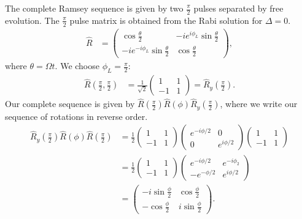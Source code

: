 \documentclass[a4paper, 11pt, normalem]{report}
\begin{document}
The complete Ramsey sequence is given by two $\frac{\pi}{2}$ pulses separated by free evolution.
The $\frac{\pi}{2}$ pulse matrix is obtained from the Rabi solution for $\Delta = 0$.
\begin{align}
    \hat{R} &= \begin{pmatrix} \cos\frac{\theta}{2} & -ie^{i\phi_L}\sin\frac{\theta}{2} \\ -ie^{-i\phi_L}\sin\frac{\theta}{2} & \cos\frac{\theta}{2}\end{pmatrix},
\end{align}
where $\theta=\Omega t$.
We choose $\phi_L=\frac{\pi}{2}$:
\begin{align}
    \hat{R}\left(\frac{\pi}{2},\frac{\pi}{2}\right) &= \frac{1}{\sqrt{2}}\begin{pmatrix} 1 & 1 \\ -1 & 1\end{pmatrix} = \hat{R}_y\left(\frac{\pi}{2}\right).
\end{align}
Our complete sequence is given by $\hat{R}\left(\frac{\pi}{2}\right)\hat{R}\left(\phi\right)\hat{R}_y\left(\frac{\pi}{2}\right)$, where we write our sequence of rotations in reverse order.
\begin{align}
    \hat{R}_y\left(\frac{\pi}{2}\right)\hat{R}(\phi)\hat{R}\left(\frac{\pi}{2}\right) &= \frac12 \begin{pmatrix} 1 & 1 \\ -1 & 1\end{pmatrix}\begin{pmatrix} e^{-i\phi/2} & 0 \\ 0 & e^{i\phi/2}\end{pmatrix} \begin{pmatrix} 1 & 1 \\ -1 & 1\end{pmatrix} \\
                                                                                      &= \frac12 \begin{pmatrix} 1 & 1 \\ -1 & 1\end{pmatrix} \begin{pmatrix} e^{-i\phi/2} & e^{-i\phi_2} \\ -e^{-\phi/2} & e^{i\phi/2}\end{pmatrix} \\
                                                                                      &= \begin{pmatrix} -i\sin\frac{\phi}{2} & \cos\frac{\phi}{2} \\ -\cos\frac{\phi}{2} & i\sin\frac{\phi}{2}\end{pmatrix}.
\end{align}
\end{document}
